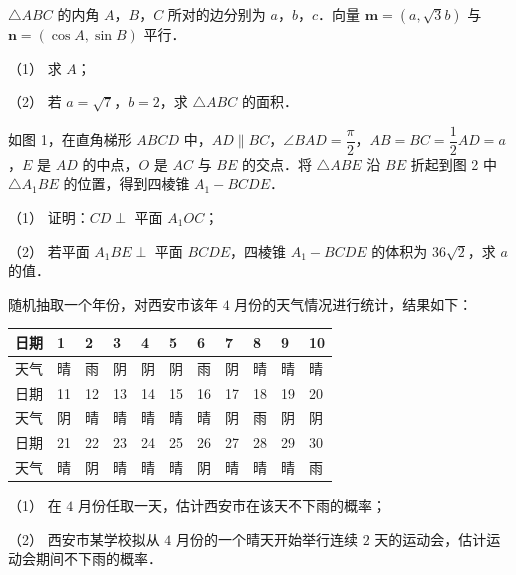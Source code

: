 \begin{question}
$\triangle ABC$ 的内角 $A$，$B$，$C$ 所对的边分别为 $a$，$b$，$c$．向量 $\boldsymbol{m}=(a,\sqrt{3}b)$ 与 $\boldsymbol{n}=(\cos A,\sin B)$ 平行．

（1） 求 $A$；

（2） 若 $a=\sqrt{7}$，$b=2$，求 $\triangle ABC$ 的面积．

\Needspace{0.4\textheight}
\end{question}
\begin{question}
如图 1，在直角梯形 $ABCD$ 中，$AD\parallel BC$，$\angle BAD=\dfrac{\pi}{2}$，$AB=BC=\dfrac{1}{2}AD=a$，$E$ 是 $AD$ 的中点，$O$ 是 $AC$ 与 $BE$ 的交点．将 $\triangle ABE$ 沿 $BE$ 折起到图 2 中 $\triangle A_{1}BE$ 的位置，得到四棱锥 $A_{1}-BCDE$．

（1） 证明：$CD\perp$ 平面 $A_{1}OC$；

（2） 若平面 $A_{1}BE\perp$ 平面 $BCDE$，四棱锥 $A_{1}-BCDE$ 的体积为 $36\sqrt{2}$，求 $a$ 的值．
\nopagebreak[4]
\begin{center}\end{center}
\nopagebreak[4]
\end{question}
\begin{question}
随机抽取一个年份，对西安市该年 $4$ 月份的天气情况进行统计，结果如下：

\begin{center}
\begingroup\setlength{\tabcolsep}{4pt}
\begin{tabular}{lllllllllll}
\toprule
日期 & 1 & 2 & 3 & 4 & 5 & 6 & 7 & 8 & 9 & 10 \\
\midrule
天气 & 晴 & 雨 & 阴 & 阴 & 阴 & 雨 & 阴 & 晴 & 晴 & 晴 \\
日期 & 11 & 12 & 13 & 14 & 15 & 16 & 17 & 18 & 19 & 20 \\
天气 & 阴 & 晴 & 晴 & 晴 & 晴 & 晴 & 阴 & 雨 & 阴 & 阴 \\
日期 & 21 & 22 & 23 & 24 & 25 & 26 & 27 & 28 & 29 & 30 \\
天气 & 晴 & 阴 & 晴 & 晴 & 晴 & 阴 & 晴 & 晴 & 晴 & 雨 \\
\bottomrule
\end{tabular}
\endgroup
\end{center}

（1） 在 $4$ 月份任取一天，估计西安市在该天不下雨的概率；

（2） 西安市某学校拟从 $4$ 月份的一个晴天开始举行连续 $2$ 天的运动会，估计运动会期间不下雨的概率．

\Needspace{0.4\textheight}
\end{question}

